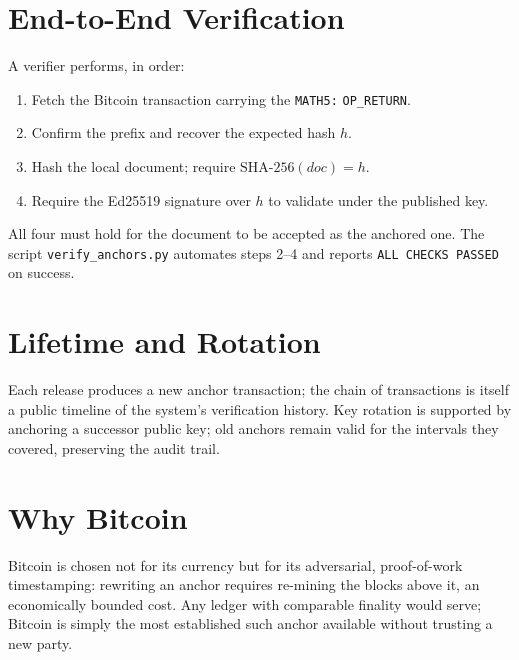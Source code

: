 \section{End-to-End Verification}
\label{sec:anc-e2e}

A verifier performs, in order:
\begin{enumerate}
  \item Fetch the Bitcoin transaction carrying the \texttt{MATH5:}
        \texttt{OP\_RETURN}.
  \item Confirm the prefix and recover the expected hash $h$.
  \item Hash the local document; require $\text{SHA-256}(doc) = h$.
  \item Require the Ed25519 signature over $h$ to validate under the
        published key.
\end{enumerate}
All four must hold for the document to be accepted as the anchored one.
The script \texttt{verify\_anchors.py} automates steps 2--4 and reports
\texttt{ALL CHECKS PASSED} on success.

\section{Lifetime and Rotation}
\label{sec:anc-life}

Each release produces a new anchor transaction; the chain of transactions
is itself a public timeline of the system's verification history. Key
rotation is supported by anchoring a successor public key; old anchors
remain valid for the intervals they covered, preserving the audit trail.

\section{Why Bitcoin}
\label{sec:anc-why}

Bitcoin is chosen not for its currency but for its adversarial,
proof-of-work timestamping: rewriting an anchor requires re-mining the
blocks above it, an economically bounded cost. Any ledger with comparable
finality would serve; Bitcoin is simply the most established such anchor
available without trusting a new party.
